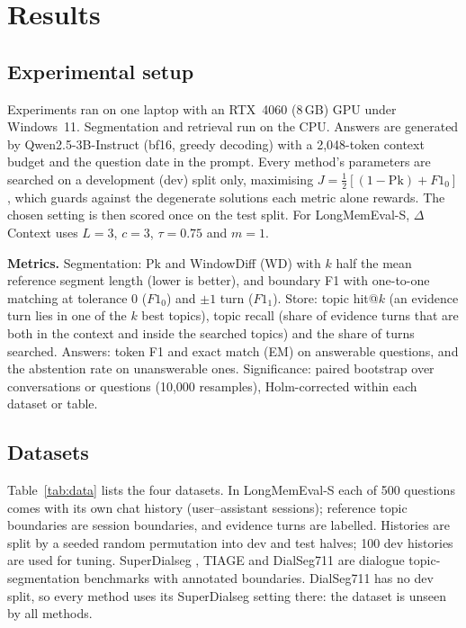 \documentclass[journal]{IEEEtran}
\newcommand{\dc}{$\Delta$Context}
\begin{document}
\section{Results}
\label{sec:results}

\subsection{Experimental setup}
Experiments ran on one laptop with an RTX~4060 (8\,GB) GPU under Windows~11.
Segmentation and retrieval run on the CPU. Answers are generated by
Qwen2.5-3B-Instruct \cite{qwen2024qwen25} (bf16, greedy decoding) with a
2,048-token context budget and the question date in the prompt. Every method's
parameters are searched on a development (dev) split only, maximising
$J=\tfrac12[(1-\mathrm{Pk})+F1_0]$, which guards against the degenerate
solutions each metric alone rewards. The chosen setting is then scored once on
the test split. For LongMemEval-S, \dc{} uses $L{=}3$, $c{=}3$, $\tau{=}0.75$
and $m{=}1$.

\textbf{Metrics.} Segmentation: Pk \cite{beeferman1999statistical} and
WindowDiff (WD) \cite{pevzner2002critique} with $k$ half the mean reference
segment length (lower is better), and boundary F1 with one-to-one matching at
tolerance 0 ($F1_0$) and $\pm1$ turn ($F1_1$). Store: topic hit@$k$ (an
evidence turn lies in one of the $k$ best topics), topic recall (share of
evidence turns that are both in the context and inside the searched topics)
and the share of turns searched. Answers: token F1 and exact match (EM) on
answerable questions, and the abstention rate on unanswerable ones.
Significance: paired bootstrap over conversations or questions (10,000
resamples), Holm-corrected \cite{holm1979simple} within each dataset or table.

\subsection{Datasets}
Table~\ref{tab:data} lists the four datasets. In LongMemEval-S
\cite{wu2025longmemeval} each of 500 questions comes with its own chat history
(user--assistant sessions); reference topic boundaries are session boundaries,
and evidence turns are labelled. Histories are split by a seeded random
permutation into dev and test halves; 100 dev histories are used for tuning.
SuperDialseg \cite{jiang2023superdialseg}, TIAGE \cite{xie2021tiage} and
DialSeg711 \cite{xu2021dialseg711} are dialogue topic-segmentation benchmarks
with annotated boundaries. DialSeg711 has no dev split, so every method uses
its SuperDialseg setting there: the dataset is unseen by all methods.
\end{document}
